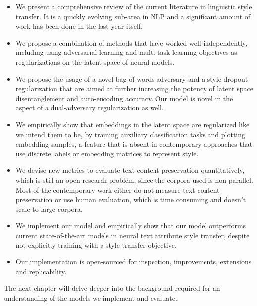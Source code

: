 \begin{itemize}
	\item We present a comprehensive review of the current literature in linguistic style transfer. It is a quickly evolving sub-area in NLP and a significant amount of work has been done in the last year itself.
	\item We propose a combination of methods that have worked well independently, including using adversarial learning and multi-task learning objectives as regularizations on the latent space of neural models.
	\item We propose the usage of a novel bag-of-words adversary and a style dropout regularization that are aimed at further increasing the potency of latent space disentanglement and auto-encoding accuracy. Our model is novel in the aspect of a dual-adversary regularization as well.
	\item We empirically show that embeddings in the latent space are regularized like we intend them to be, by training auxiliary classification tasks and plotting embedding samples, a feature that is absent in contemporary approaches that use discrete labels or embedding matrices to represent style.
	\item We devise new metrics to evaluate text content preservation quantitatively, which is still an open research problem, since the corpora used is non-parallel. Most of the contemporary work either do not measure text content preservation or use human evaluation, which is time consuming and doesn't scale to large corpora.
	\item We implement our model and empirically show that our model outperforms current state-of-the-art models in neural text attribute style transfer, despite not explicitly training with a style transfer objective.
	\item Our implementation is open-sourced for inspection, improvements, extensions and replicability.
\end{itemize}

The next chapter will delve deeper into the background required for an understanding of the models we implement and evaluate.
